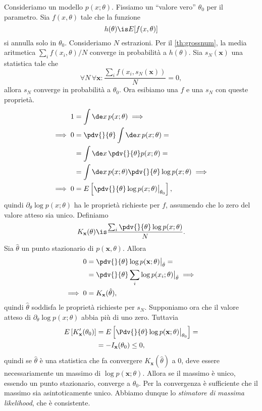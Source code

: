 Consideriamo un modello $p(x;\theta)$.
Fissiamo un ``valore vero'' $\theta_0$ per il parametro.
%
Sia $f(x,\theta)$ tale che la funzione
\begin{equation*}
	h(\theta)\is E[f(x,\theta)]
\end{equation*}
si annulla solo in $\theta_0$.
Consideriamo $N$ estrazioni.
Per il \autoref{th:grossnum},
la media aritmetica $\sum_i f(x_i,\theta)/N$ converge in probabilità a $h(\theta)$.
Sia $s_N(\mathbf x)$ una statistica tale che
\begin{equation*}
	\forall N \,\forall\mathbf x: \frac{\sum_i f(x_i,s_N(\mathbf x))}N = 0,
\end{equation*}
allora $s_N$ converge in probabilità a $\theta_0$.
%
Ora esibiamo una $f$ e una $s_N$ con queste proprietà.
\begin{align*}
	1
	&= \int\de x\, p(x;\theta) \implies \\
	\implies 0
	&= \pdv{}{\theta} \int\de x\, p(x;\theta) = \\
	&= \int\de x\, \pdv{}{\theta} p(x;\theta) = \\
	&= \int\de x\, p(x;\theta) \pdv{}{\theta} \log p(x;\theta) \implies \\
	\implies 0
	&= E \left[ \pdv{}{\theta} \log p(x;\theta) \big|_{\theta_0} \right],
\end{align*}
quindi $\partial_\theta \log p(x;\theta)$ ha le proprietà richieste per $f$,
assumendo che lo zero del valore atteso sia unico.
Definiamo
\begin{equation*}
	K_{\mathbf x}(\theta)
	\is \frac{\sum_i \pdv{}{\theta} \log p(x;\theta)} N.
\end{equation*}
Sia $\hat\theta$ un punto stazionario di $p(\mathbf x,\theta)$.
Allora
\begin{align*}
	0
	&= \pdv{}{\theta} \log p(\mathbf x;\theta) \big|_{\hat\theta} = \\
	&= \pdv{}{\theta} \sum_i \log p(x_i;\theta) \big|_{\hat\theta} \implies \\
	\implies 0
	&= K_{\mathbf x}(\hat\theta),
\end{align*}
quindi $\hat\theta$ soddisfa le proprietà richieste per $s_N$.
Supponiamo ora che il valore atteso di
$\partial_\theta \log p(x;\theta)$
abbia più di uno zero.
Tuttavia
\begin{align*}
	E \left[ K_{\mathbf x}'(\theta_0) \right]
	&= E \left[ \Pdv{}{\theta} \log p(\mathbf x;\theta) \big|_{\theta_0} \right] = \\
	&= -I_{\mathbf x}(\theta_0)
	\le 0,
\end{align*}
quindi se $\hat\theta$ è una statistica che fa convergere $K_{\mathbf x}(\hat\theta)$ a $0$,
deve essere necessariamente un massimo di $\log p(\mathbf x;\theta)$.
%
Allora se il massimo è unico, essendo un punto stazionario,
converge a $\theta_0$.
Per la convergenza è sufficiente che il massimo sia asintoticamente unico.
Abbiamo dunque lo \emph{stimatore di massima likelihood},
che è consistente.
